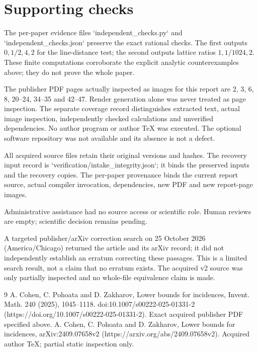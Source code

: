 \documentclass[10pt]{article}
\begin{document}
\section*{Supporting checks}
The per-paper evidence files `independent\_checks.py` and `independent\_checks.json` preserve the exact rational checks. The first outputs \(0,1/2,4,2\) for the line-distance test; the second outputs lattice ratios \(1,1/1024,2\). These finite computations corroborate the explicit analytic counterexamples above; they do not prove the whole paper.\par
The publisher PDF pages actually inspected as images for this report are 2, 3, 6, 8, 20–24, 34–35 and 42–47. Render generation alone was never treated as page inspection. The separate coverage record distinguishes extracted text, actual image inspection, independently checked calculations and unverified dependencies. No author program or author TeX was executed. The optional software repository was not available and its absence is not a defect.\par
All acquired source files retain their original versions and hashes. The recovery input record is `verification/intake\_integrity.json`; it binds the preserved inputs and the recovery copies. The per-paper provenance binds the current report source, actual compiler invocation, dependencies, new PDF and new report-page images.\par
Administrative assistance had no source access or scientific role. Human reviews are empty; scientific decision remains pending.\par
A targeted publisher/arXiv correction search on 25 October 2026 (America/Chicago) returned the article and its arXiv record; it did not independently establish an erratum correcting these passages. This is a limited search result, not a claim that no erratum exists. The acquired v2 source was only partially inspected and no whole-file equivalence claim is made.\par
9 A. Cohen, C. Pohoata and D. Zakharov, Lower bounds for incidences, Invent. Math. 240 (2025), 1045–1118. doi:10.1007/s00222-025-01331-2 (https://doi.org/10.1007/s00222-025-01331-2). Exact acquired publisher PDF specified above. A. Cohen, C. Pohoata and D. Zakharov, Lower bounds for incidences, arXiv:2409.07658v2 (https://arxiv.org/abs/2409.07658v2). Acquired author TeX; partial static inspection only.\par
\end{document}
